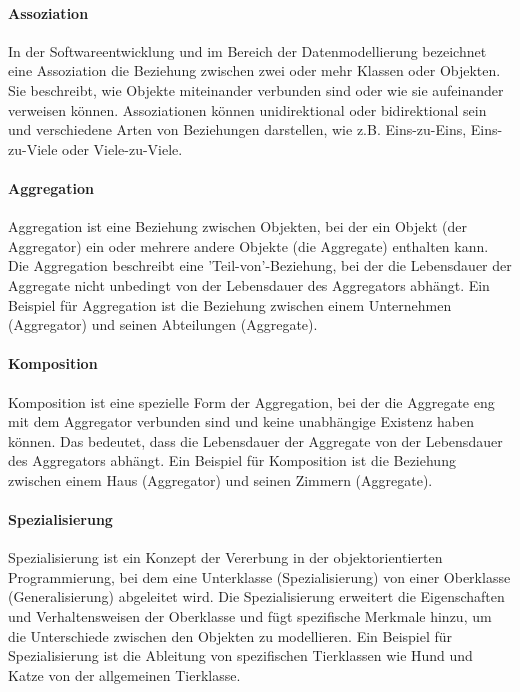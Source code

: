 \paragraph{Assoziation}

In der Softwareentwicklung und im Bereich der Datenmodellierung bezeichnet eine Assoziation die Beziehung zwischen zwei oder mehr Klassen oder Objekten. Sie beschreibt, wie Objekte miteinander verbunden sind oder wie sie aufeinander verweisen können. Assoziationen können unidirektional oder bidirektional sein und verschiedene Arten von Beziehungen darstellen, wie z.B. Eins-zu-Eins, Eins-zu-Viele oder Viele-zu-Viele.

\paragraph{Aggregation}

Aggregation ist eine Beziehung zwischen Objekten, bei der ein Objekt (der Aggregator) ein oder mehrere andere Objekte (die Aggregate) enthalten kann. Die Aggregation beschreibt eine 'Teil-von'-Beziehung, bei der die Lebensdauer der Aggregate nicht unbedingt von der Lebensdauer des Aggregators abhängt. Ein Beispiel für Aggregation ist die Beziehung zwischen einem Unternehmen (Aggregator) und seinen Abteilungen (Aggregate).

\paragraph{Komposition}

Komposition ist eine spezielle Form der Aggregation, bei der die Aggregate eng mit dem Aggregator verbunden sind und keine unabhängige Existenz haben können. Das bedeutet, dass die Lebensdauer der Aggregate von der Lebensdauer des Aggregators abhängt. Ein Beispiel für Komposition ist die Beziehung zwischen einem Haus (Aggregator) und seinen Zimmern (Aggregate).

\paragraph{Spezialisierung}

Spezialisierung ist ein Konzept der Vererbung in der objektorientierten Programmierung, bei dem eine Unterklasse (Spezialisierung) von einer Oberklasse (Generalisierung) abgeleitet wird. Die Spezialisierung erweitert die Eigenschaften und Verhaltensweisen der Oberklasse und fügt spezifische Merkmale hinzu, um die Unterschiede zwischen den Objekten zu modellieren. Ein Beispiel für Spezialisierung ist die Ableitung von spezifischen Tierklassen wie Hund und Katze von der allgemeinen Tierklasse.

